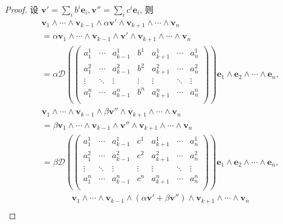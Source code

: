 \documentclass[color=black,device=normal,lang=cn,mode=geye]{elegantnote}
\begin{document}
\begin{proof}
    设 $\boldsymbol{v}'=\sum\limits_{i}b^i\boldsymbol{e}_i,\boldsymbol{v}''=\sum\limits_{i}c^i\boldsymbol{e}_i$, 则
    \begin{align*}
        & \boldsymbol{v}_1\wedge\cdots\wedge\boldsymbol{v}_{k-1}\wedge\alpha\boldsymbol{v}'\wedge\boldsymbol{v}_{k+1}\wedge\cdots\wedge\boldsymbol{v}_n \\
        & =\alpha\boldsymbol{v}_1\wedge\cdots\wedge\boldsymbol{v}_{k-1}\wedge\boldsymbol{v}'\wedge\boldsymbol{v}_{k+1}\wedge\cdots\wedge\boldsymbol{v}_n \\
        & =\alpha\mathcal{D}\left(\begin{pmatrix}
            a_1^1 & \cdots & a_{k-1}^1 & b^1 & a_{k+1}^1 & \cdots & a_n^1 \\
            a_1^2 & \cdots & a_{k-1}^2 & b^2 & a_{k+1}^2 & \cdots & a_n^2 \\
            \vdots & \ddots & \vdots & \vdots & \vdots & \ddots & \vdots \\
            a_1^n & \cdots & a_{k-1}^n & b^n & a_{k+1}^n & \cdots & a_n^n \\
        \end{pmatrix}\right)\boldsymbol{e}_1\wedge\boldsymbol{e}_2\wedge\cdots\wedge\boldsymbol{e}_n,
    \end{align*}
    \begin{align*}
        & \boldsymbol{v}_1\wedge\cdots\wedge\boldsymbol{v}_{k-1}\wedge\beta\boldsymbol{v}''\wedge\boldsymbol{v}_{k+1}\wedge\cdots\wedge\boldsymbol{v}_n \\
        & =\beta\boldsymbol{v}_1\wedge\cdots\wedge\boldsymbol{v}_{k-1}\wedge\boldsymbol{v}''\wedge\boldsymbol{v}_{k+1}\wedge\cdots\wedge\boldsymbol{v}_n \\
        & =\beta\mathcal{D}\left(\begin{pmatrix}
            a_1^1 & \cdots & a_{k-1}^1 & c^1 & a_{k+1}^1 & \cdots & a_n^1 \\
            a_1^2 & \cdots & a_{k-1}^2 & c^2 & a_{k+1}^2 & \cdots & a_n^2 \\
            \vdots & \ddots & \vdots & \vdots & \vdots & \ddots & \vdots \\
            a_1^n & \cdots & a_{k-1}^n & c^n & a_{k+1}^n & \cdots & a_n^n \\
        \end{pmatrix}\right)\boldsymbol{e}_1\wedge\boldsymbol{e}_2\wedge\cdots\wedge\boldsymbol{e}_n,
    \end{align*}
    \begin{align*}
        & \boldsymbol{v}_1\wedge\cdots\wedge\boldsymbol{v}_{k-1}\wedge(\alpha\boldsymbol{v}'+\beta\boldsymbol{v}'')\wedge\boldsymbol{v}_{k+1}\wedge\cdots\wedge\boldsymbol{v}_n \\

\end{align*}
\end{proof}
\end{document}
